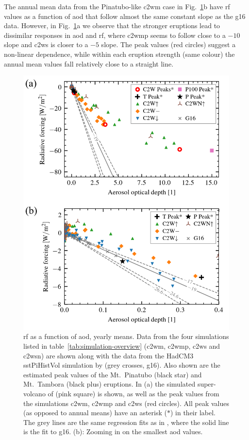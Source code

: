 \documentclass{ametsocV6.1}
\begin{document}
The annual mean data from the Pinatubo-like \gls{c2wm} case in
Fig.~\ref{fig:aod_vs_toa_ses_avg}b have \gls{rf} values as a function of \gls{aod} that
follow almost the same constant slope as the \gls{g16} data. However, in
Fig.~\ref{fig:aod_vs_toa_ses_avg}a we observe that the stronger eruptions lead to
dissimilar responses in \gls{aod} and \gls{rf}, where \gls{c2wmp}
seems to follow close to a \(-10\) slope and \gls{c2ws} is closer to a
\(-5\) slope. The peak values (red circles) suggest a non-linear dependence, while
within each eruption strength (same colour) the annual mean values fall relatively close
to a straight line.

\begin{figure}
  \centering
  \includegraphics{figures/figure2.png}

  \caption{\gls{rf} as a function of \gls{aod}, yearly means. Data from the four
    simulations listed in table~\ref{tab:simulation-overview} (\gls{c2wm}, \gls{c2wmp},
    \gls{c2ws} and \gls{c2wsn}) are shown along with the data from the HadCM3 sstPiHistVol
    simulation by \citet{gregory2016} (grey crosses, \gls{g16}). Also shown are the estimated peak
    values of the Mt.\ Pinatubo (black star) and Mt.\ Tambora (black plus) eruptions. In (a)
    the simulated super-volcano of \citet{jones2005} (pink square) is shown, as well as the
    peak values from the simulations \gls{c2wm}, \gls{c2wmp} and \gls{c2ws} (red circles).
    All peak values (as opposed to annual means) have an asterisk (\(\ast{}\)) in their
    label. The grey lines are the same regression fits as in \citet[][Fig.\ 4]{gregory2016},
    where the solid line is the fit to \gls{g16}. (b): Zooming
    in on the smallest \gls{aod} values.}\label{fig:aod_vs_toa_ses_avg}%
\end{figure}
\end{document}
